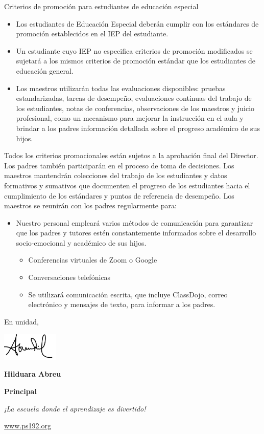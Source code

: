 \documentclass[12pt,letterpaper]{article}
\begin{document}
Criterios de promoción para estudiantes de educación especial\begin{itemize}
\item Los estudiantes de Educación Especial deberán cumplir con los estándares de promoción establecidos en el IEP del estudiante.
\item Un estudiante cuyo IEP no especifica criterios de promoción modificados se sujetará a los mismos criterios de promoción estándar que los estudiantes de educación general.
\item Los maestros utilizarán todas las evaluaciones disponibles: pruebas estandarizadas,
tareas de desempeño, evaluaciones continuas del trabajo de los estudiantes, notas de conferencias, observaciones de los maestros y juicio profesional, como un mecanismo para mejorar la instrucción en el aula y brindar a los padres información detallada sobre el progreso académico de sus hijos.
\end{itemize}
Todos los criterios promocionales están sujetos a la aprobación final del Director. Los padres también participarán en el proceso de toma de decisiones. Los maestros mantendrán colecciones del trabajo de los estudiantes y datos formativos y sumativos que documenten el progreso de los estudiantes hacia el cumplimiento de los estándares y puntos de referencia de desempeño. Los maestros se reunirán con los padres regularmente para:
\begin{itemize}
\pagebreak
\vspace*{1.5cm}
\item Nuestro personal empleará varios métodos de comunicación para garantizar que los padres y tutores estén constantemente informados sobre el desarrollo socio-emocional y académico de sus hijos.
	\begin{itemize}
	\item Conferencias virtuales de Zoom o Google
	\item Conversaciones telefónicas
	\item Se utilizará comunicación escrita, que incluye ClassDojo, correo electrónico y mensajes de texto, para informar a los padres.
	\end{itemize}
\end{itemize}


En unidad,

\includegraphics[width=0.2\textwidth]{hil_signature}

\textbf{Hilduara Abreu}

\textbf{Principal}

\textit{¡La escuela donde el aprendizaje es divertido!}

\url{www.ps192.org}
\end{document}
